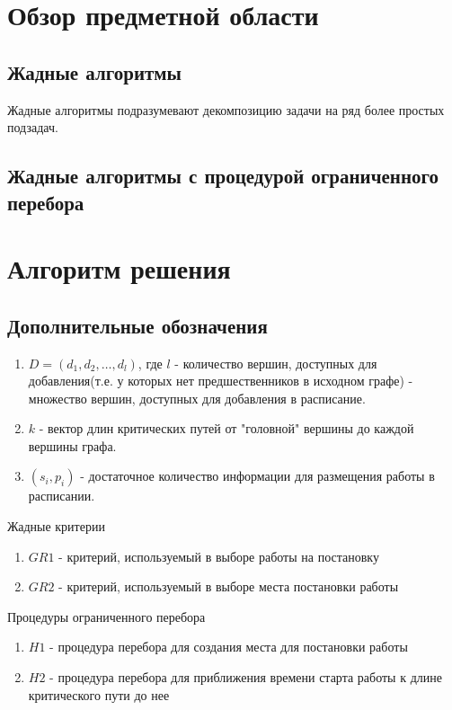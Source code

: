 \documentclass[12pt]{article}
\begin{document}
\section{Обзор предметной области}

\subsection{Жадные алгоритмы}
Жадные алгоритмы подразумевают декомпозицию задачи на ряд более простых подзадач.

\subsection{Жадные алгоритмы с процедурой ограниченного перебора}

\newpage
\section{Алгоритм решения}
\subsection{Дополнительные обозначения}
\begin{enumerate}
    \item $D= \left( d_1, d_2, \dots, d_l \right)$, где $l$ - количество вершин, доступных для добавления(т.е. у которых нет предшественников в исходном графе) - множество вершин, доступных для добавления в расписание.
    \item $k$ - вектор длин критических путей от "головной" вершины до каждой вершины графа.
    \item $\left( s_i, p_i \right)$ - достаточное количество информации для размещения работы в расписании.
\end{enumerate}
Жадные критерии
\begin{enumerate}
    \item $GR1$ - критерий, используемый в выборе работы на постановку
    \item $GR2$ - критерий, используемый в выборе места постановки работы
\end{enumerate}
Процедуры ограниченного перебора
\begin{enumerate}
    \item $H1$ - процедура перебора для создания места для постановки работы
    \item $H2$ - процедура перебора для приближения времени старта работы к длине критического пути до нее
\end{enumerate}
\end{document}
